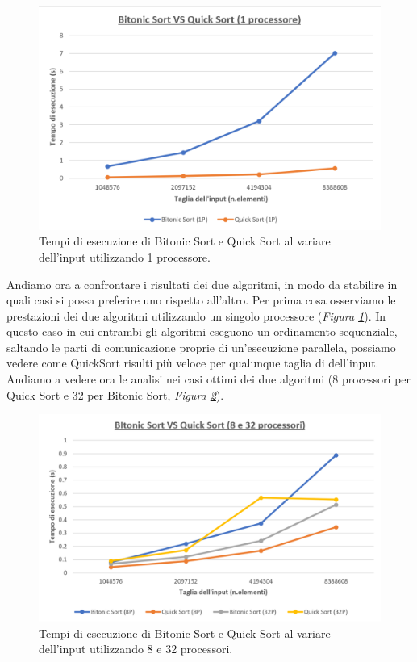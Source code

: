 \begin{figure}
\centering
\includegraphics[scale=0.3]{images/BitonicVSQuick1P}
\caption{\footnotesize{Tempi di esecuzione di Bitonic Sort e Quick Sort al variare dell'input utilizzando 1 processore.}}\label{img.BitonicVSQuick1P}
\end{figure}

Andiamo ora a confrontare i risultati dei due algoritmi, in modo da stabilire in quali casi si possa preferire uno rispetto all'altro.
Per prima cosa osserviamo le prestazioni dei due algoritmi utilizzando un singolo processore (\textit{Figura \ref{img.BitonicVSQuick1P}}). In questo caso in cui entrambi gli algoritmi eseguono un ordinamento sequenziale, saltando le parti di comunicazione proprie di un'esecuzione parallela, possiamo vedere come QuickSort risulti più veloce per qualunque taglia di dell'input.
Andiamo a vedere ora le analisi nei casi ottimi dei due algoritmi (8 processori per Quick Sort e 32 per Bitonic Sort, \textit{Figura \ref{img.BitonicVSQuick8-32P}}). 

\begin{figure}
\centering
\includegraphics[scale=0.3]{images/BitonicVSQuick8-32P}
\caption{\footnotesize{Tempi di esecuzione di Bitonic Sort e Quick Sort al variare dell'input utilizzando 8 e 32 processori.}}\label{img.BitonicVSQuick8-32P}
\end{figure}


